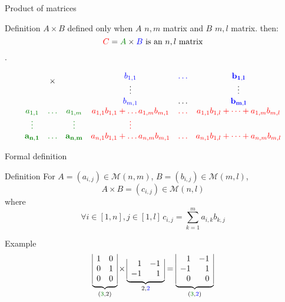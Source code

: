 \documentclass{beamer}
\begin{document}
\begin{frame}{Product of matrices}

  \begin{block}{Definition}
    \alert{$A \times B$ defined only when $A$ $n,m$ matrix and $B$ $m,l$ matrix.} then: \[{\color{red}C} = {\color{darkgreen} A} \times {\color{blue} B}\textnormal{  is an $n,l$ matrix} \].
    
    \[
    \begin{array}{cccccc}
      & \multirow{2}{*}{$\times$} & &  \color{blue}b_{1,1} &\color{blue} \dots & \bf\color{blue} b_{1,l}\\
      &                           & &  \vdots &       & \bf \vdots\\
      &                           & & \color{blue} b_{m,1}  & \dots & \bf \color{blue}b_{m, l}\\
       \color{darkgreen}a_{1,1} & \color{darkgreen} \dots &  \color{darkgreen}a_{1,m} & \color{red}a_{1,1}b_{1,1} + \dots a_{1,m}b_{m,1}  & \color{red}\dots  & \color{red}a_{1,1}b_{1, l} + \dots + a_{1, m}b_{m, l}\\
      \color{darkgreen}\vdots &       & \color{darkgreen}\vdots  &\color{red}\vdots  &  &\phantom{\color{red}\vdots} \\
      \bf \color{darkgreen}a_{n,1} &  \bf \color{darkgreen}\dots &  \bf \color{darkgreen}a_{n, m}& \color{red}a_{n,1}b_{1,1} + \dots a_{n,m}b_{m,1}  & \color{red}\dots  & \color{red}a_{n,1}b_{1, l} + \dots + a_{n, m}b_{m, l}\\
    \end{array}
    \]
    
  \end{block}
  
\end{frame}

\begin{frame}{Formal definition}
  \begin{block}{Definition}
    For $A = (a_{i,j}) \in \mathcal{M}(n,m)$, $B = (b_{i,j}) \in \mathcal{M}(m, l)$,
    \[A \times B = (c_{i,j}) \in \mathcal{M}(n, l) \] where
    \[\forall i \in [1, n], j \in [1,l]\, c_{i,j} = \sum^{m}_{k = 1} a_{i, k}b_{k, j}\]
  \end{block}
\end{frame}

\begin{frame}{Example}
  \[ \underbrace{\begin{array}{|cc|} 1 & 0 \\ 0 & 1 \\ 0 &  0  \end{array}}_{(\textcolor{darkgreen}{3},2)} \times \underbrace{\begin{array}{|cc|} \phantom{-}1 & -1 \\ -1 & \phantom{-}1 \end{array}}_{2,\textcolor{blue}{2}} = \underbrace{\begin{array}{|cc|} \phantom{-}1 & -1 \\ -1 & \phantom{-}1 \\ \phantom{-}0 & \phantom{-}0  \end{array}}_{(\textcolor{darkgreen}{3}, \textcolor{blue}{2} )}    \]
\end{frame}
\end{document}
